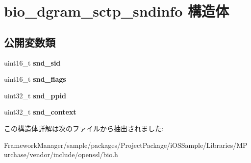 \hypertarget{structbio__dgram__sctp__sndinfo}{}\section{bio\+\_\+dgram\+\_\+sctp\+\_\+sndinfo 構造体}
\label{structbio__dgram__sctp__sndinfo}
\subsection*{公開変数類}
\begin{DoxyCompactItemize}
\item 
\hypertarget{structbio__dgram__sctp__sndinfo_ab22988d5927028b0284c6cf18ff589dc}{}uint16\+\_\+t {\bfseries snd\+\_\+sid}\label{structbio__dgram__sctp__sndinfo_ab22988d5927028b0284c6cf18ff589dc}

\item 
\hypertarget{structbio__dgram__sctp__sndinfo_ac0269a06039c3f2a59a258eabf0648d6}{}uint16\+\_\+t {\bfseries snd\+\_\+flags}\label{structbio__dgram__sctp__sndinfo_ac0269a06039c3f2a59a258eabf0648d6}

\item 
\hypertarget{structbio__dgram__sctp__sndinfo_a63933a21b96198ede95c5ab03b4884a1}{}uint32\+\_\+t {\bfseries snd\+\_\+ppid}\label{structbio__dgram__sctp__sndinfo_a63933a21b96198ede95c5ab03b4884a1}

\item 
\hypertarget{structbio__dgram__sctp__sndinfo_a64de10bcaaadde29adef5a53ec28d9b3}{}uint32\+\_\+t {\bfseries snd\+\_\+context}\label{structbio__dgram__sctp__sndinfo_a64de10bcaaadde29adef5a53ec28d9b3}

\end{DoxyCompactItemize}


この構造体詳解は次のファイルから抽出されました\+:\begin{DoxyCompactItemize}
\item 
Framework\+Manager/sample/packages/\+Project\+Package/i\+O\+S\+Sample/\+Libraries/\+M\+Purchase/vendor/include/openssl/bio.\+h\end{DoxyCompactItemize}
